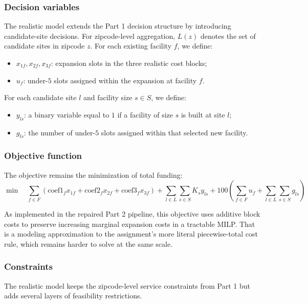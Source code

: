 \documentclass[11pt]{article}
\newcommand{\1}{\mathbb{I}}
\begin{document}
\subsubsection{Decision variables}

The realistic model extends the Part 1 decision structure by introducing candidate-site decisions. For zipcode-level aggregation, \(L(z)\) denotes the set of candidate sites in zipcode \(z\). For each existing facility \(f\), we define:
\begin{itemize}
    \item \(x_{1f}, x_{2f}, x_{3f}\): expansion slots in the three realistic cost blocks;
    \item \(u_f\): under-\(5\) slots assigned within the expansion at facility \(f\).
\end{itemize}

\noindent
For each candidate site \(l\) and facility size \(s \in S\), we define:
\begin{itemize}
    \item \(y_{ls}\): a binary variable equal to \(1\) if a facility of size \(s\) is built at site \(l\);
    \item \(g_{ls}\): the number of under-\(5\) slots assigned within that selected new facility.
\end{itemize}

\subsubsection{Objective function}

The objective remains the minimization of total funding:
\[
\min \quad
\sum_{f \in F} \left(\mathrm{coef1}_f x_{1f} + \mathrm{coef2}_f x_{2f} + \mathrm{coef3}_f x_{3f}\right)
+
\sum_{l \in L} \sum_{s \in S} K_s y_{ls}
+
100\left(\sum_{f \in F} u_f + \sum_{l \in L} \sum_{s \in S} g_{ls}\right)
\]

As implemented in the repaired Part 2 pipeline, this objective uses additive block costs to preserve increasing marginal expansion costs in a tractable MILP. That is a modeling approximation to the assignment's more literal piecewise-total cost rule, which remains harder to solve at the same scale.

\subsubsection{Constraints}

The realistic model keeps the zipcode-level service constraints from Part 1 but adds several layers of feasibility restrictions.
\end{document}
